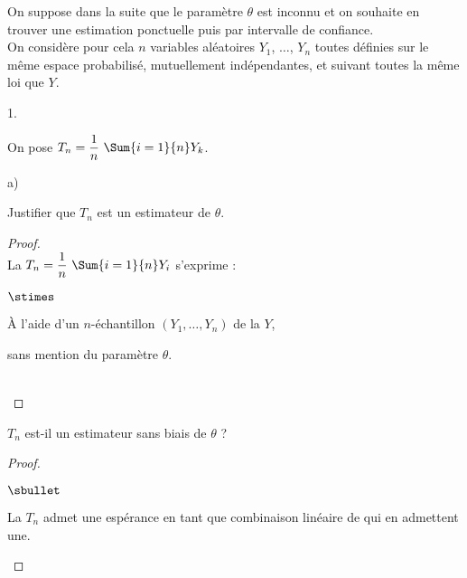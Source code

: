 \documentclass[11pt]{article}%
\begin{document}
\noindent
On suppose dans la suite que le paramètre $\theta$ est inconnu et on
souhaite en trouver une estimation ponctuelle puis par intervalle de
confiance.\\
On considère pour cela $n$ variables aléatoires $Y_1$, $\ldots$, $Y_n$
toutes définies sur le même espace probabilisé, mutuellement
indépendantes, et suivant toutes la même loi que $Y$.
\begin{noliste}{1.}
  \setlength{\itemsep}{4mm}
  \setcounter{enumi}{7}
\item On pose $T_n = \dfrac{1}{n} \ \Sum{i=1}{n} Y_k$.
  \begin{noliste}{a)}
    \setlength{\itemsep}{2mm}
  \item Justifier que $T_n$ est un estimateur de $\theta$.
    \begin{proof}~\\
      La \var $T_n = \dfrac{1}{n} \ \Sum{i=1}{n} Y_i$ s'exprime :
      \begin{noliste}{$\stimes$}
      \item À l'aide d'un $n$-échantillon $(Y_1, \ldots, Y_n)$ de la
        \var $Y$,
        
      \item sans mention du paramètre $\theta$.
      \end{noliste}
      ~\\[-1cm]
    \end{proof}
    
  \item $T_n$ est-il un estimateur sans biais de $\theta$ ?
    \begin{proof}~
      \begin{noliste}{$\sbullet$}
      \item La \var $T_n$ admet une espérance en tant que combinaison
        linéaire de \var qui en admettent une.
        

\end{noliste}
\end{proof}
\end{noliste}
\end{noliste}
\end{document}
